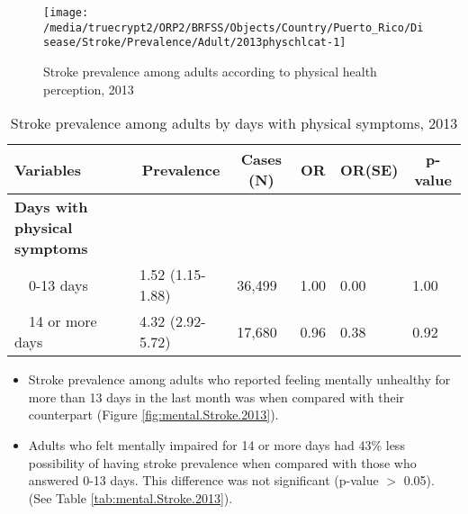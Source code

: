 \begin{figure}[H]
\caption{Stroke prevalence among adults according to physical health perception, 2013}
\label{fig:phys.Stroke.2013}
\begin{knitrout}
\color{fgcolor}

{\centering \texttt{[image: /media/truecrypt2/ORP2/BRFSS/Objects/Country/Puerto\_Rico/Disease/Stroke/Prevalence/Adult/2013physchlcat-1]} 

}



\end{knitrout}
 \end{figure}

\begin{table}[H]
\caption{Stroke prevalence among adults by days with physical symptoms, 2013\label{tab:phys.Stroke.2013}} 
\begin{center}
\begin{tabular}{llllll}
\hline\hline
\multicolumn{1}{l}{Variables}&\multicolumn{1}{c}{Prevalence}&\multicolumn{1}{c}{Cases (N)}&\multicolumn{1}{c}{OR}&\multicolumn{1}{c}{OR(SE)}&\multicolumn{1}{c}{p-value}\tabularnewline
\hline
{\bfseries Days with physical symptoms}&&&&&\tabularnewline
~~0-13 days&1.52 (1.15-1.88)&36,499&1.00&0.00&1.00\tabularnewline
~~14 or more days&4.32 (2.92-5.72)&17,680&0.96&0.38&0.92\tabularnewline
\hline
\end{tabular}\end{center}

\end{table}


 \newpage
\begin{itemize}

\item Stroke prevalence among adults who reported feeling mentally unhealthy for more than 13 days in the last month was  when compared with their counterpart (Figure \ref{fig:mental.Stroke.2013}).


\item  Adults who felt mentally impaired for 14 or more days had 43\% less possibility of having stroke prevalence when compared with those who answered 0-13 days. This difference was not significant (p-value $>$ 0.05). (See Table \ref{tab:mental.Stroke.2013}).

\end{itemize}

